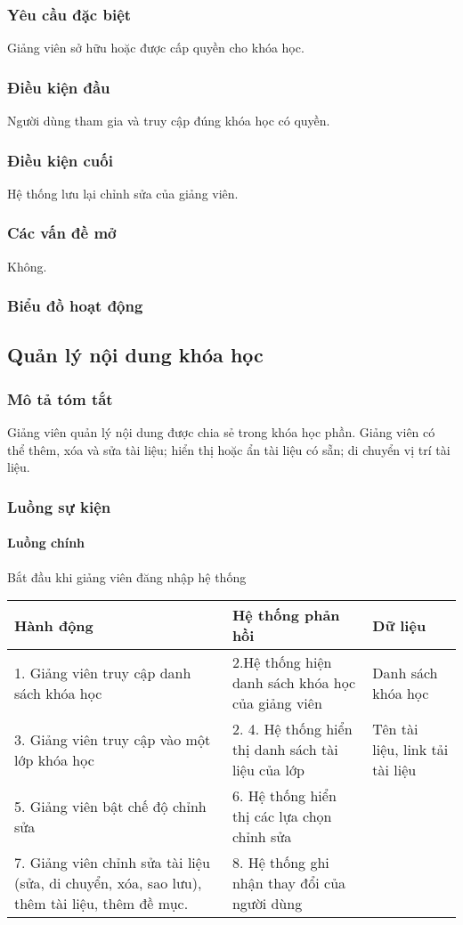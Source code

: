 \documentclass[./../main_file.tex]{subfiles}
\begin{document}
\subsubsection{Yêu cầu đặc biệt}
Giảng viên sở hữu hoặc được cấp quyền cho khóa học.

\subsubsection{Điều kiện đầu}
Người dùng tham gia và truy cập đúng khóa học có quyền.

\subsubsection{Điều kiện cuối}
Hệ thống lưu lại chỉnh sửa của giảng viên.

\subsubsection{Các vấn đề mở}
Không.

\subsubsection{Biểu đồ hoạt động}

\subsection{Quản lý nội dung khóa học}
\subsubsection{Mô tả tóm tắt}
Giảng viên quản lý nội dung được chia sẻ trong khóa học phần. Giảng viên có thể thêm, xóa và sửa tài liệu; hiển thị hoặc ẩn tài liệu có sẵn; di chuyển vị trí tài liệu.
\subsubsection{Luồng sự kiện}
\paragraph{Luồng chính}
Bắt đầu khi giảng viên đăng nhập hệ thống
\begin{longtable}{|p{}|p{}|p{}|}
		\hline
		\textbf{Hành động}              & \textbf{Hệ thống phản hồi}               & \textbf{Dữ liệu} \\ \hline
		1. Giảng viên truy cập danh sách khóa học & 2.Hệ thống hiện danh sách khóa học của giảng viên & Danh sách khóa học \\ \hline
		3. Giảng viên truy cập vào một lớp khóa học                                    & 2. 4. Hệ thống hiển thị danh sách tài liệu của lớp & Tên tài liệu, link tải tài liệu \\ \hline
		5. Giảng viên bật chế độ chỉnh sửa & 6. Hệ thống hiển thị các lựa chọn chỉnh sửa &                  \\ \hline
		7. Giảng viên chỉnh sửa tài liệu (sửa, di chuyển, xóa, sao lưu), thêm tài liệu, thêm đề mục. & 8. Hệ thống ghi nhận thay đổi của người dùng    &                                 \\ \hline
\end{longtable}
\end{document}
